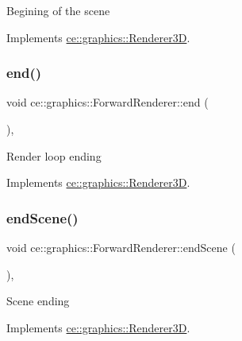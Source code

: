 Begining of the scene 

Implements \hyperlink{classce_1_1graphics_1_1_renderer3_d_a94e60931e0ff3f26b217db09a11ee7e6}{ce\+::graphics\+::\+Renderer3D}.

\mbox{\label{classce_1_1graphics_1_1_forward_renderer_a8a8c16a645e63fd54b932f62d96d805b}} 
\subsubsection{\texorpdfstring{end()}{end()}}
{\footnotesize\ttfamily void ce\+::graphics\+::\+Forward\+Renderer\+::end (\begin{DoxyParamCaption}{ }\end{DoxyParamCaption})\hspace{0.3cm}{\ttfamily [override]}, {\ttfamily [virtual]}}

Render loop ending 

Implements \hyperlink{classce_1_1graphics_1_1_renderer3_d_a4d35e07f42a4fb42ebe3f8e57bfcdb58}{ce\+::graphics\+::\+Renderer3D}.

\mbox{\label{classce_1_1graphics_1_1_forward_renderer_a34bf60e44a9a594ab596f46ca7688e3e}} 
\subsubsection{\texorpdfstring{end\+Scene()}{endScene()}}
{\footnotesize\ttfamily void ce\+::graphics\+::\+Forward\+Renderer\+::end\+Scene (\begin{DoxyParamCaption}{ }\end{DoxyParamCaption})\hspace{0.3cm}{\ttfamily [override]}, {\ttfamily [virtual]}}

Scene ending 

Implements \hyperlink{classce_1_1graphics_1_1_renderer3_d_a0b8feaf1dd7f6ee03c7be2197d012e25}{ce\+::graphics\+::\+Renderer3D}.

\mbox{\label{classce_1_1graphics_1_1_forward_renderer_ac6c7ad9a18ecfb2cbb6aee202e7e2e8f}} 
